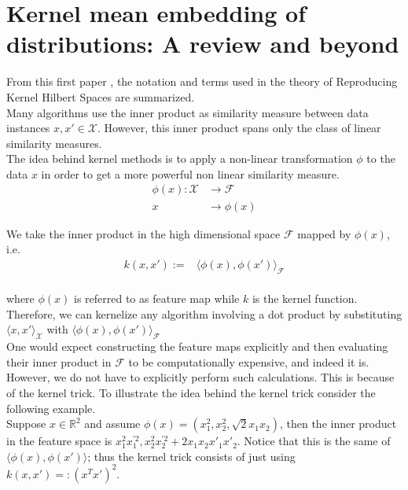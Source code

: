 
\section{Kernel mean embedding of distributions: A review and beyond}
From this first paper \cite{Muandet_2017}, the notation and terms used in the theory of Reproducing Kernel Hilbert Spaces are summarized.
\\
Many algorithms use the inner product as similarity measure between data instances $x, x' \in \mathcal{X}$. However, this inner product spans only the class of linear similarity measures. 
\\
The idea behind kernel methods is to apply a non-linear transformation $\phi$ to the data $x$ 
in order to get a more powerful non linear similarity measure.
\begin{align*}
\phi(x)\colon \mathcal{X} &\to \mathcal{F}
    \\
    x&\to \phi(x)
\end{align*}


We take the inner product in the high dimensional space $\mathcal{F}$ mapped by $\phi(x)$, i.e.\
\\
\begin{align*}
k(x,x'):=&\langle \phi(x), \phi(x') \rangle_{\mathcal{F}}
\end{align*}
\\
where $\phi(x)$ is referred to as feature map while $k$ is the kernel function.
\\
Therefore, we can kernelize any algorithm involving a dot product by substituting $\langle x, x' \rangle_{\mathcal{X}}$ with $\langle \phi(x), \phi(x') \rangle_{\mathcal{F}}$
\\
One would expect constructing the feature maps explicitly and then evaluating their inner product in $\mathcal{F}$ to be computationally expensive, and indeed it is. However, we do not have to explicitly perform such calculations. This is because of the kernel trick.
To illustrate the idea behind the kernel trick consider the following example. 
\\
Suppose $x \in \mathbb{R}^2$ and assume $\phi(x)=(x_{1}^{2},x_{2}^{2},\sqrt{2}x_{1}x_{2})$, then the inner product in the feature space is $x_{1}^{2}x_{1}^{'2},x_{2}^{2}x_{2}^{'2}+2x_{1}x_{2}x'_{1}x'_{2}$.
Notice that this is the same of $\langle \phi(x), \phi(x') \rangle$; thus the kernel trick consists of just using $k(x,x')=:(x^Tx')^2$.



